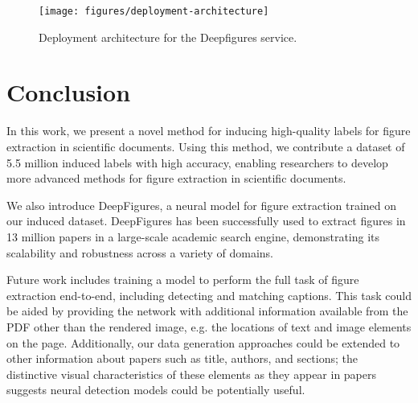 \documentclass[sigconf]{acmart}
\begin{document}
\begin{figure}
\texttt{[image: figures/deployment-architecture]}
\caption{Deployment architecture for the Deepfigures service.}
\label{fig:deployment-architecture}
\end{figure}
\section{Conclusion} 
In this work, we present a novel method for inducing high-quality labels for figure extraction in scientific documents.
Using this method, we contribute a dataset of 5.5 million induced labels with high accuracy, enabling researchers to develop more advanced methods for figure extraction in scientific documents.

We also introduce DeepFigures, a neural model for figure extraction trained on our induced dataset. DeepFigures has been successfully used to extract figures in 13 million papers in a large-scale academic search engine, demonstrating its scalability and robustness across a variety of domains.

Future work includes training a model to perform the full task of figure extraction end-to-end, including detecting and matching captions. This task could be aided by providing the network with additional information available from the PDF other than the rendered image, e.g. the locations of text and image elements on the page. Additionally, our data generation approaches could be extended to other information about papers such as title, authors, and sections; the distinctive visual characteristics of these elements as they appear in papers suggests neural detection models could be potentially useful.



\balance
 
\end{document}
